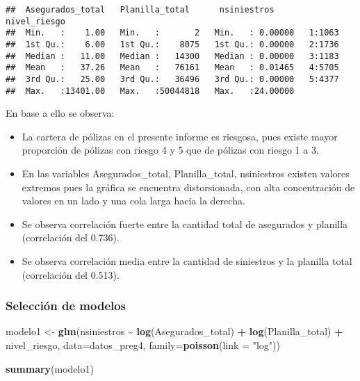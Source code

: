 \documentclass[]{article}
\newenvironment{Shaded}{\begin{snugshade}}{\end{snugshade}}
\newcommand{\DataTypeTok}[1]{\textcolor[rgb]{0.13,0.29,0.53}{#1}}
\newcommand{\KeywordTok}[1]{\textcolor[rgb]{0.13,0.29,0.53}{\textbf{#1}}}
\newcommand{\NormalTok}[1]{#1}
\newcommand{\OperatorTok}[1]{\textcolor[rgb]{0.81,0.36,0.00}{\textbf{#1}}}
\newcommand{\StringTok}[1]{\textcolor[rgb]{0.31,0.60,0.02}{#1}}
\providecommand{\tightlist}{%
  \setlength{\itemsep}{0pt}\setlength{\parskip}{0pt}}
\begin{document}
\begin{verbatim}
##  Asegurados_total   Planilla_total      nsiniestros       nivel_riesgo
##  Min.   :    1.00   Min.   :       2   Min.   : 0.00000   1:1063      
##  1st Qu.:    6.00   1st Qu.:    8075   1st Qu.: 0.00000   2:1736      
##  Median :   11.00   Median :   14300   Median : 0.00000   3:1183      
##  Mean   :   37.26   Mean   :   76161   Mean   : 0.01465   4:5705      
##  3rd Qu.:   25.00   3rd Qu.:   36496   3rd Qu.: 0.00000   5:4377      
##  Max.   :13401.00   Max.   :50044818   Max.   :24.00000
\end{verbatim}

En base a ello se observa:

\begin{itemize}
\tightlist
\item
  La cartera de pólizas en el presente informe es riesgosa, pues existe
  mayor proporción de pólizas con riesgo 4 y 5 que de pólizas con riesgo
  1 a 3.
\item
  En las variables Asegurados\_total, Planilla\_total, nsiniestros
  existen valores extremos pues la gráfica se encuentra distorsionada,
  con alta concentración de valores en un lado y una cola larga hacia la
  derecha.
\item
  Se observa correlación fuerte entre la cantidad total de asegurados y
  planilla (correlación del 0.736).
\item
  Se observa correlación media entre la cantidad de siniestros y la
  planilla total (correlación del 0.513).
\end{itemize}

\hypertarget{selecciuxf3n-de-modelos}{%
\subsubsection{Selección de modelos}\label{selecciuxf3n-de-modelos}}

\begin{Shaded}
\begin{Highlighting}[]
\NormalTok{modelo1 <{-}}\StringTok{ }\KeywordTok{glm}\NormalTok{(nsiniestros }\OperatorTok{\textasciitilde{}}\StringTok{ }\KeywordTok{log}\NormalTok{(Asegurados\_total) }\OperatorTok{+}\StringTok{ }\KeywordTok{log}\NormalTok{(Planilla\_total) }\OperatorTok{+}\StringTok{ }\NormalTok{nivel\_riesgo, }
\DataTypeTok{data=}\NormalTok{datos\_preg4, }\DataTypeTok{family=}\KeywordTok{poisson}\NormalTok{(}\DataTypeTok{link =} \StringTok{"log"}\NormalTok{))}

\KeywordTok{summary}\NormalTok{(modelo1)}
\end{Highlighting}
\end{Shaded}
\end{document}
